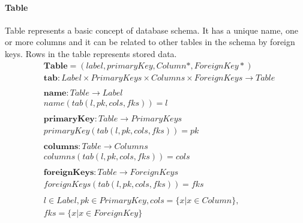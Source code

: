 \documentclass[11pt]{article}
\begin{document}
\paragraph{Table} Table represents a basic concept of database schema. It has a unique name, one or more columns and it can be related to other tables in the schema by foreign keys. Rows in the table represents stored data.
\begin{align*}
&	\mathbf{Table} = (label, primaryKey, Column*, ForeignKey*)\\
&	\mathbf{tab} 	: Label \times PrimaryKeys \times Columns \times ForeignKeys \rightarrow Table \\ \\
&	\mathbf{name} : Table \rightarrow Label  \\
&	name(tab(l, pk, cols, fks)) = l \\ \\
&	\mathbf{primaryKey} : Table \rightarrow PrimaryKeys  \\
&	primaryKey(tab(l, pk, cols, fks)) = pk \\ \\
&	\mathbf{columns} : Table \rightarrow Columns  \\
&	columns(tab(l, pk, cols, fks)) = cols \\ \\
&	\mathbf{foreignKeys} : Table \rightarrow ForeignKeys  \\
&	foreignKeys(tab(l, pk, cols, fks)) = fks \\ \\
& l \in Label, pk \in PrimaryKey, cols  = \{ x | x \in Column\}, \\
& fks  = \{ x | x \in ForeignKey\}
\end{align*}
\end{document}
